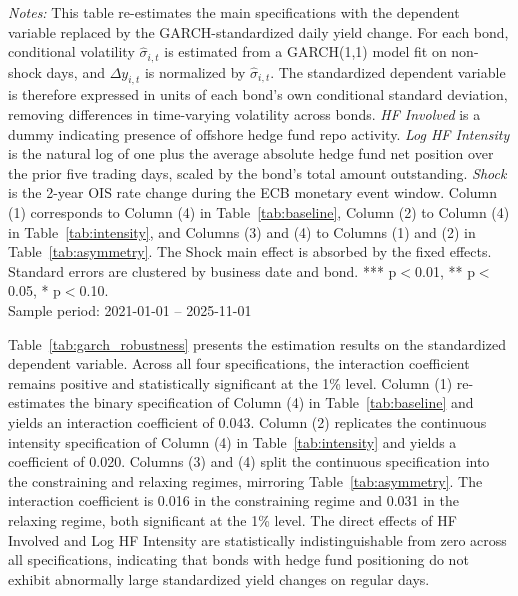 \documentclass[english, 11pt, oneside]{article}
\begin{document}
\begin{table}[t]
\vspace{1ex}
\raggedright\scriptsize
\textit{Notes:} This table re-estimates the main specifications with the dependent variable replaced by the GARCH-standardized daily yield change. For each bond, conditional volatility $\hat{\sigma}_{i,t}$ is estimated from a GARCH(1,1) model fit on non-shock days, and $\Delta y_{i,t}$ is normalized by $\hat{\sigma}_{i,t}$. The standardized dependent variable is therefore expressed in units of each bond's own conditional standard deviation, removing differences in time-varying volatility across bonds. \textit{HF Involved} is a dummy indicating presence of offshore hedge fund repo activity. \textit{Log HF Intensity} is the natural log of one plus the average absolute hedge fund net position over the prior five trading days, scaled by the bond's total amount outstanding. \textit{Shock} is the 2-year OIS rate change during the ECB monetary event window. Column (1) corresponds to Column (4) in Table~\ref{tab:baseline}, Column (2) to Column (4) in Table~\ref{tab:intensity}, and Columns (3) and (4) to Columns (1) and (2) in Table~\ref{tab:asymmetry}. The Shock main effect is absorbed by the fixed effects. Standard errors are clustered by business date and bond. *** p$<$0.01, ** p$<$0.05, * p$<$0.10. \\ Sample period: 2021-01-01 -- 2025-11-01
\end{table}

Table~\ref{tab:garch_robustness} presents the estimation results on the standardized dependent variable. Across all four specifications, the interaction coefficient remains positive and statistically significant at the 1\% level. Column (1) re-estimates the binary specification of Column (4) in Table~\ref{tab:baseline} and yields an interaction coefficient of 0.043. Column (2) replicates the continuous intensity specification of Column (4) in Table~\ref{tab:intensity} and yields a coefficient of 0.020. Columns (3) and (4) split the continuous specification into the constraining and relaxing regimes, mirroring Table~\ref{tab:asymmetry}. The interaction coefficient is 0.016 in the constraining regime and 0.031 in the relaxing regime, both significant at the 1\% level. The direct effects of HF Involved and Log HF Intensity are statistically indistinguishable from zero across all specifications, indicating that bonds with hedge fund positioning do not exhibit abnormally large standardized yield changes on regular days.
\end{document}

